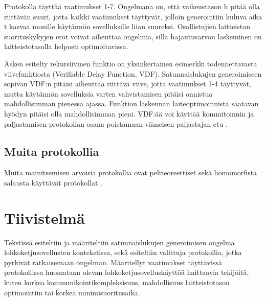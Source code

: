 \documentclass{article}
\begin{document}
Protokolla täyttää vaatimukset 1-7. Ongelmana on, että vaikeustason h pitää olla riittävän suuri, jotta kaikki vaatimukset täyttyvät, jolloin generointiin kuluva aika t kasvaa monille käytännön sovelluksille liian suureksi. Osallistujien laitteiston suorituskykyjen erot voivat aiheuttaa ongelmia, sillä hajautusarvon laskeminen on laitteistotasolla helposti optimoitavissa.

Äsken esitelty rekursiivinen funktio on yksinkertainen esimerkki todennettavasta viivefunktiosta (Verifiable Delay Function, VDF). Satunnaislukujen generoimiseen sopivan VDF:n pitäisi aiheuttaa riittävä viive, jotta vaatimukset 1-4 täyttyvät, mutta käytännön sovelluksia varten vahvistamisen pitäisi onnistua mahdollisimman pienessä ajassa. Funktion laskennan laiteoptimoinnista saatavan hyödyn pitäisi olla mahdollisimman pieni. VDF:ää voi käyttää kommitoinnin ja paljastamisen protokollan osana poistamaan viimeisen paljastajan etu \cite{boneh_verifiable_2018}.

\subsection{Muita protokollia}
Muita mainitsemisen arvoisia protokollia ovat peliteoreettiset sekä homomorfista salausta käyttävät protokollat \cite{simic_review_2020}. 

\section{Tiivistelmä}
Tekstissä esiteltiin ja määriteltiin satunnaislukujen generoimisen ongelma lohkoketjusovellusten kontekstissa, sekä esiteltiin valittuja protokollia, jotka pyrkivät ratkaisemaan ongelman. Määritellyt vaatimukset täyttävissä protokollissa huomataan olevan lohkoketjusovelluskäyttöä haittaavia tekijöitä, kuten korkea kommunikointikompleksisuus, mahdollisuus laitteistotason optimointiin tai korkea minimisuoritusaika.



\end{document}
